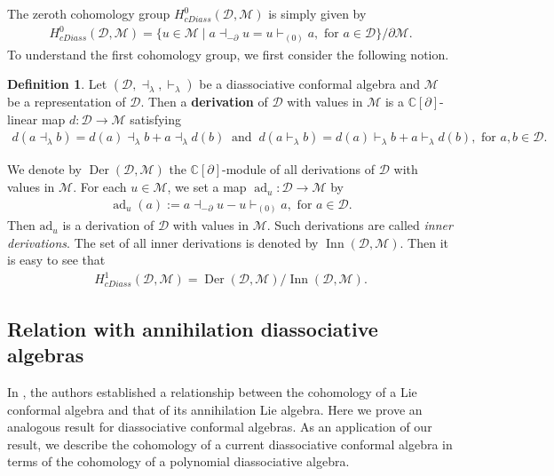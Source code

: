 \documentclass[a4paper,reqno,10pt]{amsart}
\theoremstyle{plain}
\theoremstyle{definition}
\newtheorem{definition}[thm]{Definition}
\theoremstyle{remark}
\newcommand{\C}{\mathbb{C}}
\newcommand{\D}{\mathcal{D}}
\newcommand{\M}{\mathcal{M}}
\newcommand{\p}{\partial}
\newcommand{\la}{\lambda}
\begin{document}
\medskip

The zeroth cohomology group $H_{cDiass}^{0}(\D,\M)$ is simply given by
\begin{align*}
H_{cDiass}^{0}(\D,\M)= \{u \in \M \mid a \dashv_{-\partial} u = u \vdash_{(0)} a, \text{ for } a \in \D\} / \partial \M.
\end{align*}
To understand the first cohomology group, we first consider the following notion.
\begin{definition}
Let $(\D, \dashv_{\la}, \vdash_{\la})$ be a diassociative conformal algebra and $\M$ be a representation of $\D$. Then a {\bf derivation} of $\D$ with values in $\M$ is a $\C[\p]$-linear map $d: \D \rightarrow \M$ satisfying
\begin{align*}
d(a\dashv_{\la}b)=d(a)\dashv_{\la}b + a\dashv_{\la}d(b) ~ \text{ and } ~
d(a\vdash_{\la}b)=d(a)\vdash_{\la}b + a\vdash_{\la}d(b),  \text{ for } a,b\in \D.
\end{align*}
\end{definition}
We denote by $\operatorname{Der}(\D,\M)$ the $\C[\p]$-module of all derivations of $\D$ with values in $\M$. For each $u \in \M$, we set a map $\operatorname{ad}_{u}: \D \rightarrow \M$
by
\begin{align*}
\operatorname{ad}_{u}(a) := a\dashv_{-\p}u - u\vdash_{(0)}a, \text{ for } a\in \D.
\end{align*}
Then $\mathrm{ad}_u$ is a derivation of $\D$ with values in $\M$.
Such derivations are called \emph{inner derivations}. The set of all inner derivations is denoted by $\operatorname{Inn}(\D,\M)$. Then it is easy to see that
\begin{align*}
H_{cDiass}^{1}(\D,\M)
=\operatorname{Der}(\D,\M)/\operatorname{Inn}(\D,\M).
\end{align*}

\medskip

\subsection*{Relation with annihilation diassociative algebras}

In \cite{bakalov-kac-voronov}, the authors established a relationship between the cohomology of a Lie conformal algebra and that of its annihilation Lie algebra. Here we prove an analogous result for diassociative conformal algebras. As an application of our result, we describe the cohomology of a current diassociative conformal algebra in terms of the cohomology of a polynomial diassociative algebra.
\end{document}
